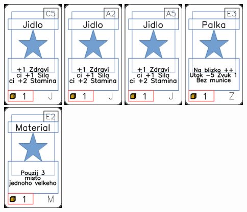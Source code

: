 \documentclass[a4paper]{article}
\begin{document}
	\includegraphics[width=3.0cm]{img-1_14}
	\includegraphics[width=3.0cm]{img-1_1}
	\includegraphics[width=3.0cm]{img-1_4}
	\includegraphics[width=3.0cm]{img-1_82}
	\includegraphics[width=3.0cm]{img-1_51}
\end{document}
